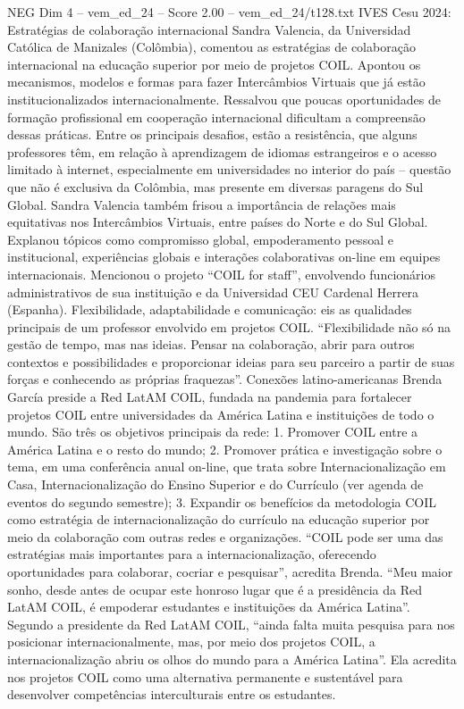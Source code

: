 \begin{textsample}{NEG Dim 4 – vem\_ed\_24 – Score 2.00 – vem\_ed\_24/t128.txt}  \label{ex:f4_neg_064}
IVES Cesu 2024: Estratégias de colaboração internacional Sandra Valencia, da Universidad Católica de Manizales (Colômbia), comentou as estratégias de colaboração internacional na educação superior por meio de projetos COIL.
Apontou os mecanismos, modelos e formas para fazer Intercâmbios Virtuais que já estão institucionalizados internacionalmente.
Ressalvou que poucas oportunidades de formação profissional em cooperação internacional dificultam a compreensão dessas práticas.
Entre os principais desafios, estão a resistência, que alguns professores têm, em relação à aprendizagem de idiomas estrangeiros e o acesso limitado à internet, especialmente em universidades no interior do país – questão que não é exclusiva da Colômbia, mas presente em diversas paragens do Sul Global.
Sandra Valencia também frisou a importância de relações mais equitativas nos Intercâmbios Virtuais, entre países do Norte e do Sul Global.
Explanou tópicos como compromisso global, empoderamento pessoal e institucional, experiências globais e interações colaborativas on-line em equipes internacionais.
Mencionou o projeto “COIL for staff”, envolvendo funcionários administrativos de sua instituição e da Universidad CEU Cardenal Herrera (Espanha).
Flexibilidade, adaptabilidade e comunicação: eis as qualidades principais de um professor envolvido em projetos COIL. “Flexibilidade não só na gestão de tempo, mas nas ideias.
Pensar na colaboração, abrir para outros contextos e possibilidades e proporcionar ideias para seu parceiro a partir de suas forças e conhecendo as próprias fraquezas”.
Conexões latino-americanas Brenda García preside a Red LatAM COIL, fundada na pandemia para fortalecer projetos COIL entre universidades da América Latina e instituições de todo o mundo.
São três os objetivos principais da rede: 1.
Promover COIL entre a América Latina e o resto do mundo; 2.
Promover prática e investigação sobre o tema, em uma conferência anual on-line, que trata sobre Internacionalização em Casa, Internacionalização do Ensino Superior e do Currículo (ver agenda de eventos do segundo semestre); 3.
Expandir os benefícios da metodologia COIL como estratégia de internacionalização do currículo na educação superior por meio da colaboração com outras redes e organizações. “COIL pode ser uma das estratégias mais importantes para a internacionalização, oferecendo oportunidades para colaborar, cocriar e pesquisar”, acredita Brenda. “Meu maior sonho, desde antes de ocupar este honroso lugar que é a presidência da Red LatAM COIL, é empoderar estudantes e instituições da América Latina”.
Segundo a presidente da Red LatAM COIL, “ainda falta muita pesquisa para nos posicionar internacionalmente, mas, por meio dos projetos COIL, a internacionalização abriu os olhos do mundo para a América Latina”.
Ela acredita nos projetos COIL como uma alternativa permanente e sustentável para desenvolver competências interculturais entre os estudantes.

\end{textsample}
